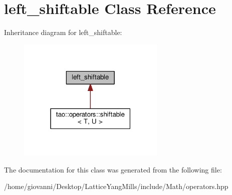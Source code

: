 \hypertarget{classleft__shiftable}{}\section{left\+\_\+shiftable Class Reference}
\label{classleft__shiftable}


Inheritance diagram for left\+\_\+shiftable\+:\nopagebreak
\begin{figure}[H]
\begin{center}
\leavevmode
\includegraphics[width=199pt]{classleft__shiftable__inherit__graph}
\end{center}
\end{figure}


The documentation for this class was generated from the following file\+:\begin{DoxyCompactItemize}
\item 
/home/giovanni/\+Desktop/\+Lattice\+Yang\+Mills/include/\+Math/operators.\+hpp\end{DoxyCompactItemize}
